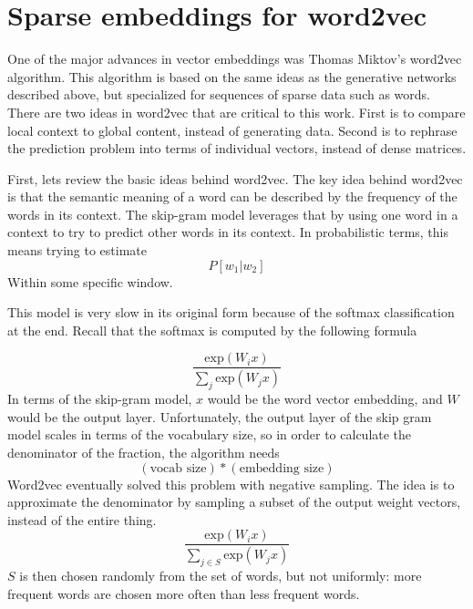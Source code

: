 \documentclass{article}
\newcommand{\Exp}{\text{exp}}
\begin{document}
	
	
	\section{Sparse embeddings for word2vec}
	
	One of the major advances in vector embeddings was Thomas Miktov's word2vec algorithm. This algorithm is based on the same ideas as the generative networks described above, but specialized for sequences of sparse data such as words. There are two ideas in word2vec that are critical to this work. First is to compare local context to global content, instead of generating data. Second is to rephrase the prediction problem into terms of individual vectors, instead of dense matrices. 
	
	First, lets review the basic ideas behind word2vec. The key idea behind word2vec is that the semantic meaning of a word can be described by the frequency of the words in its context. The skip-gram model leverages that by using one word in a context to try to predict other words in its context. In probabilistic terms, this means trying to estimate
	$$P[w_1 | w_2]$$ Within some specific window.  
	
	
	This model is very slow in its original form because of the softmax classification at the end. Recall that the softmax is computed by the following formula
	
	$$ \frac{\Exp(W_i x)}{\sum_j \Exp(W_j x)}$$
	In terms of the skip-gram model, $x$ would be the word vector embedding, and $W$ would be the output layer. Unfortunately, the output layer of the skip gram model scales in terms of the vocabulary size, so in order to calculate the denominator of the fraction, the algorithm needs $$(\text{vocab size}) * (\text{embedding size})$$
	Word2vec eventually solved this problem with negative sampling. The idea is to approximate the denominator by sampling a subset of the output weight vectors, instead of the entire thing. 
	$$ \frac{\Exp(W_i x)}{\sum_{j \in S} \Exp(W_j x)}$$
	$S$ is then chosen randomly from the set of words, but not uniformly: more frequent words are chosen more often than less frequent words. 
	
\end{document}

